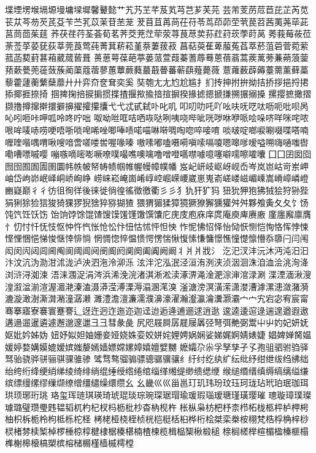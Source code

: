 堞堙塄堠塥塬墁墉墚墀馨鼙懿艹艽艿芏芊芨芄芎芑芗芙芫
芸芾芰苈苊苣芘芷芮苋苌苁芩芴芡芪芟苄苎芤苡茉苷苤茏
茇苜苴苒苘茌苻苓茑茚茆茔茕苠苕茜荑荛荜茈莒茼茴茱莛
荞茯荏荇荃荟荀茗荠茭茺茳荦荥荨茛荩荬荪荭荮莰荸莳莴
莠莪莓莜莅荼莶莩荽莸荻莘莞莨莺莼菁萁菥菘堇萘萋菝菽
菖萜萸萑萆菔菟萏萃菸菹菪菅菀萦菰菡葜葑葚葙葳蒇蒈葺
蒉葸萼葆葩葶蒌蒎萱葭蓁蓍蓐蓦蒽蓓蓊蒿蒺蓠蒡蒹蒴蒗蓥
蓣蔌甍蔸蓰蔹蔟蔺蕖蔻蓿蓼蕙蕈蕨蕤蕞蕺瞢蕃蕲蕻薤薨薇
薏蕹薮薜薅薹薷薰藓藁藜藿蘧蘅蘩蘖蘼⼶廾弈夼奁耷奕奚
奘匏⼪尢尥尬尴扌扪抟抻拊拚拗拮挢拶挹捋捃掭揶捱捺掎
掴捭掬掊捩掮掼揲揸揠揿揄揞揎摒揆掾摅摁搋搛搠搌搦搡
摞撄摭撖摺撷撸撙撺擀擐擗擤擢攉攥攮⼷弋忒甙弑卟叱叽
叩叨叻吒吖吆呋呒呓呔呖呃吡呗呙吣吲咂咔呷呱呤咚咛咄
呶呦咝哐咭哂咴哒咧咦哓哔呲咣哕咻咿哌哙哚哜咩咪咤哝
哏哞唛哧唠哽唔哳唢唣唏唑唧唪啧喏喵啉啭啁啕唿啐唼唷
啖啵啶啷唳唰啜喋嗒喃喱喹喈喁喟啾嗖喑啻嗟喽喾喔喙嗪
嗷嗉嘟嗑嗫嗬嗔嗦嗝嗄嗯嗥嗲嗳嗌嗍嗨嗵嗤辔嘞嘈嘌嘁嘤
嘣嗾嘀嘧嘭噘嘹噗嘬噍噢噙噜噌噔嚆噤噱噫噻噼嚅嚓嚯囔
⼞囗囝囡囵囫囹囿圄圊圉圜帏帙帔帑帱帻帼帷幄幔幛幞幡
岌屺岍岐岖岈岘岙岑岚岜岵岢岽岬岫岱岣峁岷峄峒峤峋峥
崂崃崧崦崮崤崞崆崛嵘崾崴崽嵬嵛嵯嵝嵫嵋嵊嵩嵴嶂嶙嶝
豳嶷巅⼻彳彷徂徇徉後徕徙徜徨徭徵徼衢⼺彡犭犰犴犷犸
狃狁狎狍狒狨狯狩狲狴狷猁狳猃狺狻猗猓猡猊猞猝猕猢猹
猥猬猸猱獐獍獗獠獬獯獾⾇舛夥飧夤⼡夂饣饧饨饩饪饫饬
饴饷饽馀馄馇馊馍馐馑馓馔馕庀庑庋庖庥庠庹庵庾庳赓廒
廑廛廨廪膺忄忉忖忏怃忮怄忡忤忾怅怆忪忭忸怙怵怦怛怏
怍怩怫怊怿怡恸恹恻恺恂恪恽悖悚悭悝悃悒悌悛惬悻悱惝
惘惆惚悴愠愦愕愣惴愀愎愫慊慵憬憔憧憷懔懵忝隳闩闫闱
闳闵闶闼闾阃阄阆阈阊阋阌阍阏阒阕阖阗阙阚丬⽙爿戕氵
汔汜汊沣沅沐沔沌汨汩汴汶沆沩泐泔沭泷泸泱泗沲泠泖泺
泫泮沱泓泯泾洹洧洌浃浈洇洄洙洎洫浍洮洵洚浏浒浔洳涑
浯涞涠浞涓涔浜浠浼浣渚淇淅淞渎涿淠渑淦淝淙渖涫渌涮
渫湮湎湫溲湟溆湓湔渲渥湄滟溱溘滠漭滢溥溧溽溻溷滗溴
滏溏滂溟潢潆潇漤漕滹漯漶潋潴漪漉漩澉澍澌潸潲潼潺濑
濉澧澹澶濂濡濮濞濠濯瀚瀣瀛瀹瀵灏灞⼧宀宄宕宓宥宸甯
骞搴寤寮褰寰蹇謇辶迓迕迥迮迤迩迦迳迨逅逄逋逦逑逍逖
逡逵逶逭逯遄遑遒遐遨遘遢遛暹遴遽邂邈邃邋⼹彐彗彖彘
尻咫屐屙孱屣屦羼弪弩弭艴弼鬻⼬屮妁妃妍妩妪妣妗姊妫
妞妤姒妲妯姗妾娅娆姝娈姣姘姹娌娉娲娴娑娣娓婀婧婊婕
娼婢婵胬媪媛婷婺媾嫫媲嫒嫔媸嫠嫣嫱嫖嫦嫘嫜嬉嬗嬖嬲
嬷孀尕尜孚孥孳孑孓孢驵驷驸驺驿驽骀骁骅骈骊骐骒骓骖
骘骛骜骝骟骠骢骣骥骧纟纡纣纥纨纩纭纰纾绀绁绂绉绋绌
绐绔绗绛绠绡绨绫绮绯绱绲缍绶绺绻绾缁缂缃缇缈缋缌缏
缑缒缗缙缜缛缟缡缢缣缤缥缦缧缪缫缬缭缯缰缱缲缳缵⼳
幺畿⼮巛甾邕玎玑玮玢玟珏珂珑玷玳珀珉珈珥珙顼琊珩珧
珞玺珲琏琪瑛琦琥琨琰琮琬琛琚瑁瑜瑗瑕瑙瑷瑭瑾璜璎璀
璁璇璋璞璨璩璐璧瓒璺韪韫韬杌杓杞杈杩枥枇杪杳枘枧杵
枨枞枭枋杷杼柰栉柘栊柩枰栌柙枵柚枳柝栀柃枸柢栎柁柽
栲栳桠桡桎桢桄桤梃栝桕桦桁桧桀栾桊桉栩梵梏桴桷梓桫
棂楮棼椟椠棹椤棰椋椁楗棣椐楱椹楠楂楝榄楫榀榘楸椴槌
榇榈槎榉楦楣楹榛榧榻榫榭槔榱槁槊槟榕槠榍槿樯槭樗樘
